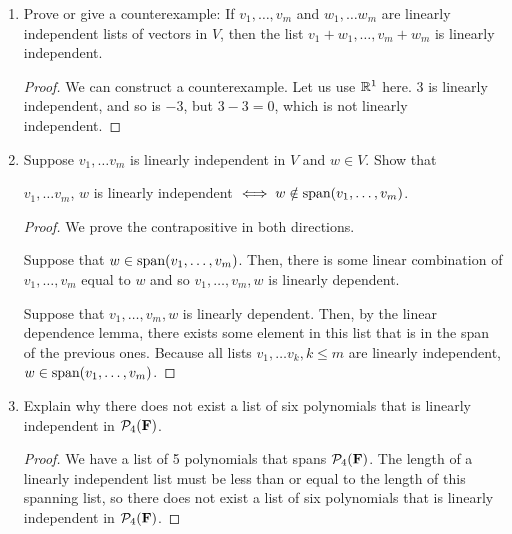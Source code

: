 \begin{enumerate}
    is linearly independent.

    \begin{proof}
        Suppose that $5v_1 - 4v_2, v_2, v_3, \dots, v_m$ was linearly dependent. Then, 
        
        \[a_1(5v_1 - 4v_2) + a_2v_2 + \cdots a_mv_m = 5a_1v_1 + (a_2 - 4a_1)v_2 + \cdots + a_mv_m = 0\]

        and we have a contradiction.
    \end{proof}

    \item[11]
    
    Prove or give a counterexample: If $v_1, \dots, v_m$ and $w_1, \dots w_m$ are linearly independent lists of vectors in $V$, then the list $v_1 + w_1, \dots, v_m + w_m$ is linearly independent. 

    \begin{proof}
        We can construct a counterexample. Let us use $\mathbb{R}^1$ here. $3$ is linearly independent, and so is $-3$, but $3 - 3 = 0$, which is not linearly independent.
    \end{proof}
    

    \item[13] Suppose $v_1, \dots v_m$ is linearly independent in $V$ and $w \in V$. Show that 
    
    $v_1, \dots v_m$, $w$ is linearly independent $\iff w \notin \text{span}(v_1, \dots, v_m)$.

    \begin{proof}
        We prove the contrapositive in both directions.

        Suppose that $w \in \text{span}(v_1, \dots, v_m)$. Then, there is some linear combination of $v_1, \dots, v_m$ equal to $w$ and so $v_1, \dots, v_m, w$ is linearly dependent. 

        Suppose that $v_1, \dots, v_m, w$ is linearly dependent. Then, by the linear dependence lemma, there exists some element in this list that is in the span of the previous ones. Because all lists $v_1, \dots v_k, k \leq m$ are linearly independent, $w \in \text{span}(v_1, \dots, v_m)$.
    \end{proof}

    \item[15] Explain why there does not exist a list of six polynomials that is linearly independent in $\mathcal{P}_4(\bold F)$.
    
    \begin{proof}
        We have a list of 5 polynomials that spans $\mathcal{P}_4(\bold F)$. The length of a linearly independent list must be less than or equal to the length of this spanning list, so there does not exist a list of six polynomials that is linearly independent in $\mathcal{P}_4(\bold F)$.
    \end{proof}


\end{enumerate}
